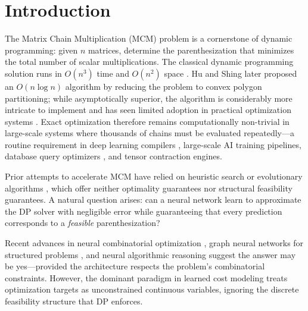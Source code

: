 \documentclass[conference]{IEEEtran}
\begin{document}
\section{Introduction}
The Matrix Chain Multiplication (MCM) problem is a cornerstone of dynamic
programming: given $n$ matrices, determine the parenthesization that minimizes
the total number of scalar multiplications. The classical dynamic programming
solution runs in $O(n^3)$ time and $O(n^2)$ space \cite{cormen2009}. Hu and Shing
\cite{hushing1982} later proposed an $O(n \log n)$ algorithm by reducing the
problem to convex polygon partitioning; while asymptotically superior, the
algorithm is considerably more intricate to implement and has seen limited
adoption in practical optimization systems \cite{lopez2023}. Exact optimization
therefore remains computationally non-trivial in large-scale systems where
thousands of chains must be evaluated repeatedly---a routine requirement in deep
learning compilers \cite{tvm2018,tiramisu2021}, large-scale AI training
pipelines, database query optimizers \cite{neo2019,balsa2022}, and tensor
contraction engines.

Prior attempts to accelerate MCM have relied on heuristic search or evolutionary
algorithms \cite{naz2021}, which offer neither optimality guarantees nor
structural feasibility guarantees. A natural question arises: can a neural
network learn to approximate the DP solver with negligible error while
guaranteeing that every prediction corresponds to a \emph{feasible}
parenthesization?

Recent advances in neural combinatorial optimization
\cite{vinyals2015,bello2017}, graph neural networks for structured problems
\cite{cappart2021,bengio2021,vesselinova2020}, and neural algorithmic reasoning
\cite{velickovic2021nar,ibarz2022generalist,velickovic2022clrs} suggest the
answer may be yes---provided the architecture respects the problem's
combinatorial constraints. However, the dominant paradigm in learned cost
modeling \cite{neo2019,balsa2022,tiramisu2021} treats optimization targets as
unconstrained continuous variables, ignoring the discrete feasibility structure
that DP enforces.
\end{document}
